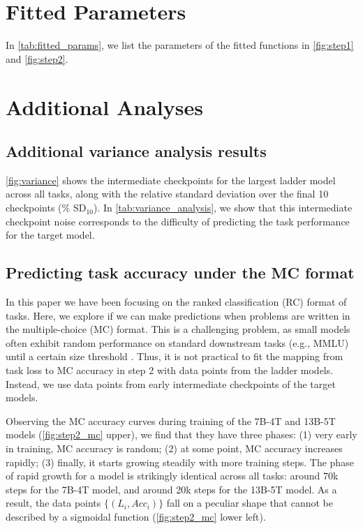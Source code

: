 \section{Fitted Parameters}
\label{app:fitted_params}

In \autoref{tab:fitted_params}, we list the parameters of the fitted functions in \autoref{fig:step1} and \autoref{fig:step2}.



\section{Additional Analyses}
\label{app:analyses}

\subsection{Additional variance analysis results}
\label{app:variance}

\autoref{fig:variance} shows the intermediate checkpoints for the largest ladder model across all tasks, along with the relative standard deviation over the final 10 checkpoints (\% SD$_{10}$). In \autoref{tab:variance_analysis}, we show that this intermediate checkpoint noise corresponds to the difficulty of predicting the task performance for the target model.



\subsection{Predicting task accuracy under the MC format}
\label{sec:mc}
In this paper we have been focusing on the ranked classification (RC) format of tasks.
Here, we explore if we can make predictions when problems are written in the multiple-choice (MC) format. This is a challenging problem, as small models often exhibit random performance on standard downstream tasks (e.g., MMLU) until a certain size threshold \citep{Hu2023PredictingEA}. 
Thus, it is not practical to fit the mapping from task loss to MC accuracy in step 2 with data points from the ladder models.
Instead, we use data points from early intermediate checkpoints of the target models.

Observing the MC accuracy curves during training of the 7B-4T and 13B-5T models (\autoref{fig:step2_mc} upper), we find that they have three phases: (1) very early in training, MC accuracy is random; (2) at some point, MC accuracy increases rapidly; (3) finally, it starts growing steadily with more training steps.
The phase of rapid growth for a model is strikingly identical across all tasks: around 70k steps for the 7B-4T model, and around 20k steps for the 13B-5T model.
As a result, the data points $\{(L_i, Acc_i)\}$ fall on a peculiar shape that cannot be described by a sigmoidal function (\autoref{fig:step2_mc} lower left).

